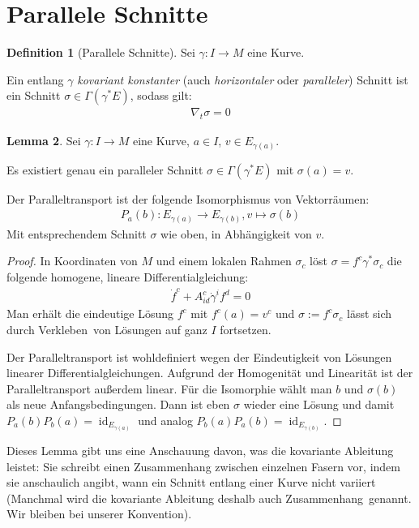 \documentclass[a4paper]{scrbook}
\numberwithin{equation}{chapter}
\DeclareMathOperator{\id}{id}
\theoremstyle{definition}
\newtheorem{defn}{Definition}[section]
\newtheorem{lemma}[defn]{Lemma}
\begin{document}
	\section{Parallele Schnitte}
		\begin{defn}[Parallele Schnitte]
			Sei $\gamma\colon I\rightarrow M$ eine Kurve.
			
			Ein entlang $\gamma$ \emph{kovariant konstanter} (auch \emph{horizontaler} oder \emph{paralleler}) Schnitt ist ein Schnitt $\sigma\in\Gamma(\gamma^*E)$, sodass gilt:
			\begin{align*}
				\nabla_t\sigma=0
			\end{align*}
		\end{defn}
		\begin{lemma}
			Sei $\gamma\colon I\rightarrow M$ eine Kurve, $a\in I$, $v\in E_{\gamma(a)}$.
			
			Es existiert genau ein paralleler Schnitt $\sigma\in \Gamma(\gamma^*E)$ mit $\sigma(a)=v$.
			
			Der Paralleltransport ist der folgende Isomorphismus von Vektorräumen:
			\begin{align*}
				P_{a}(b)\colon E_{\gamma(a)}\rightarrow E_{\gamma(b)}, v\mapsto \sigma(b)
			\end{align*}
			Mit entsprechendem Schnitt $\sigma$ wie oben, in Abhängigkeit von $v$.
			\begin{proof}
				In Koordinaten von $M$ und einem lokalen Rahmen $\sigma_c$ löst $\sigma=f^c\gamma^*\sigma_c$ die folgende homogene, lineare Differentialgleichung:
				\begin{align*}
					\dot{f}^c+A^c_{id}\dot{\gamma}^i f^d=0
				\end{align*}
				Man erhält die eindeutige Lösung $f^c$ mit $f^c(a)=v^c$ und $\sigma:=f^c\sigma_c$ lässt sich durch \glqq Verkleben\grqq\ von Lösungen auf ganz $I$ fortsetzen.
				
				Der Paralleltransport ist wohldefiniert wegen der Eindeutigkeit von Lösungen linearer Differentialgleichungen. Aufgrund der Homogenität und Linearität ist der Paralleltransport außerdem linear. Für die Isomorphie wählt man $b$ und $\sigma(b)$ als neue Anfangsbedingungen. Dann ist eben $\sigma$ wieder eine Lösung und damit $P_a(b)P_b(a)=\id_{E_{\gamma(a)}}$ und analog $P_b(a)P_a(b)=\id_{E_{\gamma(b)}}$.
			\end{proof}
		\end{lemma}
		Dieses Lemma gibt uns eine Anschauung davon, was die kovariante Ableitung leistet: Sie schreibt einen Zusammenhang zwischen einzelnen Fasern vor, indem sie anschaulich angibt, wann ein Schnitt entlang einer Kurve nicht variiert (Manchmal wird die kovariante Ableitung deshalb auch \glqq Zusammenhang\grqq\ genannt. Wir bleiben bei unserer Konvention).
		
\end{document}
